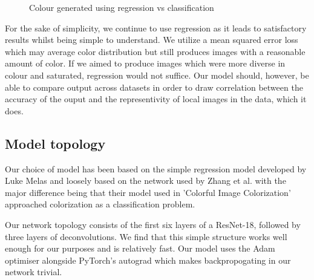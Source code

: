 \documentclass[conference]{IEEEtran}
\begin{document}
\begin{figure}[h!]
    \centering
    \qquad
    \caption{Colour generated using regression vs classification \cite{zhang2016colorful}}%
    \label{fig:reg_vs_class}
\end{figure}

For the sake of simplicity, we continue to use regression as it leads to satisfactory results whilst being simple to understand. We utilize a mean squared error loss which may average color distribution but still produces images with a reasonable amount of color. If we aimed to produce images which were more diverse in colour and saturated, regression would not suffice. Our model should, however, be able to compare output across datasets in order to draw correlation between the accuracy of the ouput and the representivity of local images in the data, which it does.

\subsection{Model topology}

Our choice of model has been based on the simple regression model developed by Luke Melas and loosely based on the network used by Zhang et al. \cite{zhang2016colorful} with the major difference being that their model used in 'Colorful Image Colorization'\cite{zhang2016colorful} approached colorization as a classification problem.

Our network topology consists of the first six layers of a ResNet-18, followed by three layers of deconvolutions. We find that this simple structure works well enough for our purposes and is relatively fast. Our model uses the Adam optimiser alongside PyTorch's autograd which makes backpropogating in our network trivial.
\end{document}
